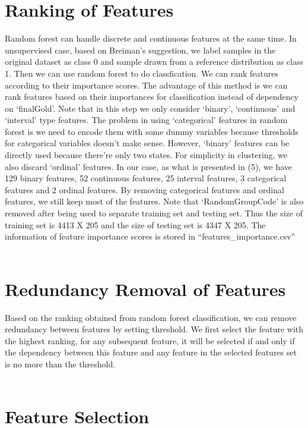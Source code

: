 \documentclass[11pt]{article}
\begin{document}
\section{Ranking of Features}
Random forest can handle discrete and continuous features at the same time. In unsupervised case, based on Breiman's suggestion, we label samples in the original dataset as class 0 and sample drawn from a reference distribution as class 1. Then we can use random forest to do classfication. We can rank features according to their importance scores. The advantage of this method is we can rank features based on their importances for classification instead of dependency on `finalGold'. Note that in this step we only consider `binary', `continuous' and `interval' type features. The problem in using `categorical' features in random forest is we need to encode them with some dummy variables because thresholds for categorical variables doesn't make sense. However, `binary' features can be directly used because there're only two states. For simplicity in clustering, we also discard `ordinal' features. In our case, as what is presented in (5), we have 129 binary features, 52 continuous features, 25 interval features, 3 categorical features and 2 ordinal features. By removing categorical features and ordinal features, we still keep most of the features. Note that `RandomGroupCode' is also removed after being used to separate training set and testing set. Thus the size of training set is 4413 X 205 and the size of testing set is 4347 X 205. The information of feature importance scores is stored in ``features\_importance.csv''\\
\\

\section{Redundancy Removal of Features}
Based on the ranking obtained from random forest classification, we can remove redundancy between features by setting threshold. We first select the feature with the highest ranking, for any subsequent feature, it will be selected if and only if the dependency between this feature and any feature in the selected features set is no more than the threshold.\\
\\

\section{Feature Selection}
\end{document}
